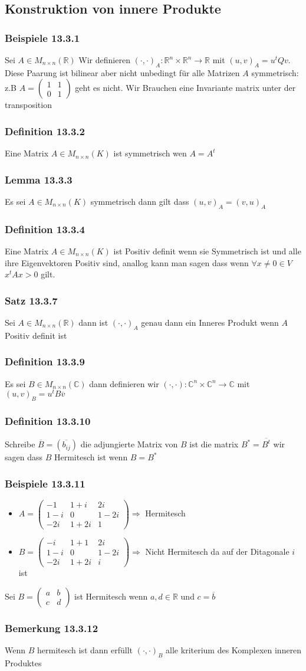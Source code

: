 \documentclass{article}
\newcommand{\satz}[1]{\subsubsection*{Satz {#1}}}
\newcommand{\beispiel}[1]{\subsubsection*{Beispiele {#1}}}
\newcommand{\bemerkung}[1]{\subsubsection*{Bemerkung {#1}}}
\newcommand{\lemma}[1]{\subsubsection*{Lemma {#1}}}
\newcommand{\definition}[1]{\subsubsection*{Definition {#1}}}
\begin{document}
\subsection*{Konstruktion von innere Produkte}
\beispiel{13.3.1} Sei $A\in M_{n\times n}(\mathbb{R})$ Wir definieren $(\cdot,\cdot)_A:\mathbb{R}^n\times\mathbb{R}^n\rightarrow \mathbb{R}$ mit $(u,v)_A=u^tQv$. Diese Paarung ist bilinear aber nicht unbedingt für alle Matrizen $A$ symmetrisch: z.B $A=\begin{pmatrix} 1&1\\0&1\end{pmatrix}$ geht es nicht.
Wir Brauchen eine Invariante matrix unter der transposition
\definition{13.3.2} Eine Matrix $A\in M_{n\times n}(K)$ ist symmetrisch wen $A=A^t$
\lemma{13.3.3} Es sei $A\in M_{n\times n}(K)$ symmetrisch dann gilt dass $(u,v)_A=(v,u)_A$ 
\definition{13.3.4} Eine Matrix $A\in M_{n\times n} (K) $ ist Positiv definit wenn sie Symmetrisch ist und alle ihre Eigenvektoren Positiv sind, anallog kann man sagen dass wenn $\forall x\neq0 \in V$ $x^tAx>0$ gilt.
\satz{13.3.7} Sei $A\in M_{n\times n}(\mathbb{R})$ dann ist $(\cdot,\cdot)_A$ genau dann ein Inneres Produkt wenn $A$ Positiv definit ist 
\definition{13.3.9} Es sei $B\in M_{n\times n}(\mathbb{C})$ dann definieren wir $(\cdot,\cdot):\mathbb{C}^n\times\mathbb{C}^n\rightarrow \mathbb{C}$ mit $(u,v)_B=u^tB\overline{v}$
\definition{13.3.10} Schreibe $\overline{B}=(\overline{b_{ij}})$ die adjungierte Matrix von $B$ ist die matrix $B^*=\overline{B^t}$ wir sagen dass $B$ Hermitesch ist wenn $B=B^*$
\beispiel{13.3.11}
\begin{itemize}
  \item{$A=\begin{pmatrix}-1&1+i&2i\\1-i&0&1-2i\\-2i&1+2i&1\end{pmatrix}\Rightarrow$ Hermitesch}
  \item{$B=\begin{pmatrix}-i&1+1&2i\\1-i&0&1-2i\\-2i&1+2i&i\end{pmatrix}\Rightarrow$ Nicht Hermitesch da auf der Ditagonale $i$ ist}
\end{itemize}
Sei $B=\begin{pmatrix}a&b\\c&d\end{pmatrix}$ ist Hermitesch wenn $a,d\in \mathbb{R}$ und $c=\overline{b}$
\bemerkung{13.3.12} Wenn $B$ hermitesch ist dann erfüllt $(\cdot,\cdot)_B$ alle kriterium des Komplexen inneren Produktes\newline
\end{document}
